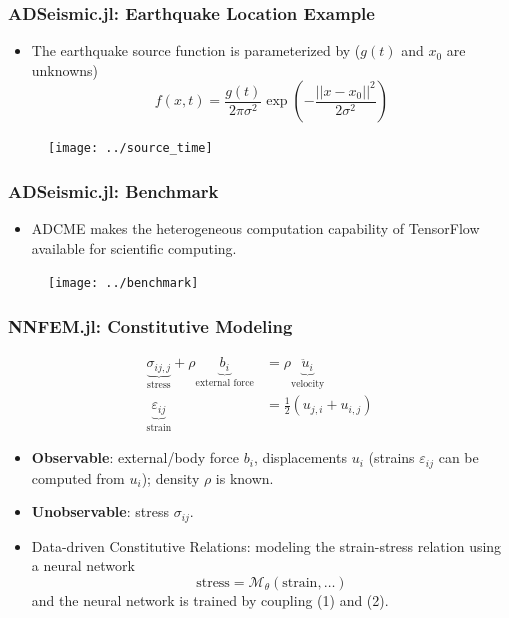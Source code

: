 \documentclass{beamer}
\begin{document}
\begin{frame}
	\frametitle{ADSeismic.jl: Earthquake Location Example}
	\begin{itemize}
		\item The earthquake source function is parameterized by ($g(t)$ and $x_0$ are unknowns)
		$$f(x, t) =  \frac{g(t)}{2\pi \sigma^2} \exp \left( -\frac{||x - x_0||^2}{2 \sigma^2} \right)$$
	\end{itemize}
	\begin{figure}[hbt]
  \texttt{[image: ../source\_time]}
\end{figure}
\end{frame}


\begin{frame}
	\frametitle{ADSeismic.jl: Benchmark}
	\begin{itemize}
		\item ADCME makes the heterogeneous computation capability of TensorFlow available for scientific computing. 
	\end{itemize}
	\begin{figure}[hbt]
  \texttt{[image: ../benchmark]}
\end{figure}
\end{frame}

\begin{frame}
	\frametitle{NNFEM.jl: Constitutive Modeling}
	
	\begin{equation}\label{equ:momentum}
  \begin{aligned}
		\underbrace{\sigma_{ij,j}}_{\mbox{stress}} + \rho \underbrace{b_i}_{\mbox{external force}} &= \rho \underbrace{\ddot u_i}_{\mbox{velocity}}\\
		\underbrace{\varepsilon_{ij}}_{\mbox{strain}} &= \frac{1}{2}(u_{j,i}+u_{i,j})
	\end{aligned}
\end{equation}

	
	\begin{itemize}
		\item \textbf{Observable}: external/body force $b_i$, displacements $u_i$ (strains $\varepsilon_{ij}$ can be computed from $u_i$); density $\rho$ is known.  
		\item \textbf{Unobservable}: stress $\sigma_{ij}$. 
		\item Data-driven Constitutive Relations: modeling the strain-stress relation using a neural network
\begin{equation}\label{equ:nn}
  	\boxed{\mbox{stress} =\mathcal{M}_{\theta}(\mbox{strain},\ldots)}
\end{equation}
		and the neural network is trained by coupling (1) and (2).
	\end{itemize}


\end{frame}
\end{document}
